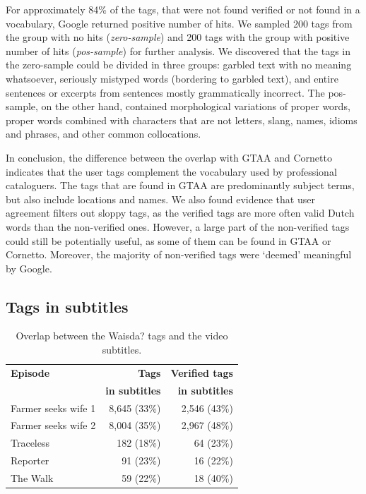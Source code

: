 For approximately 84\% of the tags, that were not found verified or not found
in a vocabulary, Google returned positive number of hits. We sampled 200 tags
from the group with no hits (\textit{zero-sample}) and 200 tags with the group
with positive number of hits (\textit{pos-sample}) for further analysis. We
discovered that the tags in the zero-sample could be divided in three groups:
garbled text with no meaning whatsoever, seriously mistyped words (bordering
to garbled text), and entire sentences or excerpts from sentences mostly
grammatically incorrect. The pos-sample, on the other hand, contained
morphological variations of proper words, proper words combined with
characters that are not letters, slang, names, idioms and phrases, and other
common collocations.

In conclusion, the difference between the overlap with GTAA and Cornetto
indicates that the user tags complement the vocabulary used by professional
cataloguers. The tags that are found in GTAA are predominantly subject terms,
but also include locations and names. We also found evidence that user
agreement filters out sloppy tags, as the verified tags are more often valid
Dutch words than the non-verified ones. However, a large part of the
non-verified tags could still be potentially useful, as some of them can be
found in GTAA or Cornetto. Moreover, the majority of non-verified tags were
`deemed' meaningful by Google.


\subsection{Tags in subtitles}
\label{tags-in-transcripts}

\begin{table}[tb]
\centering
\begin{footnotesize}
\begin{tabular*}{\columnwidth}{@{\extracolsep{\fill}}lrr}
\toprule
 \textbf{Episode} \T & \textbf{Tags} &\textbf{Verified tags}\\
 \B & \textbf{in subtitles} & \textbf{in subtitles}\\
\midrule
Farmer seeks wife 1 \T \B & 8,645 (33\%)& 2,546 (43\%)\\
Farmer seeks wife 2 \B &8,004 (35\%)&  2,967 (48\%)\\
Traceless \B & 182 (18\%)& 64 (23\%)\\
Reporter \B & 91 (23\%) &  16 (22\%)\\
The Walk \B & 59 (22\%) & 18 (40\%)\\
\bottomrule
\end{tabular*}
\end{footnotesize}
\caption{Overlap between the Waisda? tags and the video subtitles.}
\label{table:subtitles}
\end{table}

